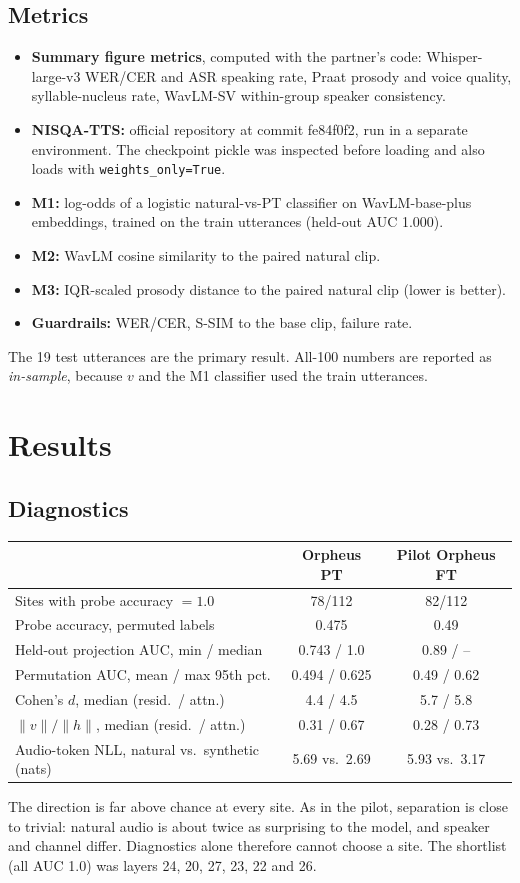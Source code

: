 \documentclass[11pt]{article}
\begin{document}
\subsection{Metrics}
\begin{itemize}
\item \textbf{Summary figure metrics}, computed with the partner's code: Whisper-large-v3 WER/CER and ASR speaking rate, Praat prosody and voice quality, syllable-nucleus rate, WavLM-SV within-group speaker consistency.
\item \textbf{NISQA-TTS:} official repository at commit fe84f0f2, run in a separate environment. The checkpoint pickle was inspected before loading and also loads with \texttt{weights\_only=True}.
\item \textbf{M1:} log-odds of a logistic natural-vs-PT classifier on WavLM-base-plus embeddings, trained on the train utterances (held-out AUC 1.000).
\item \textbf{M2:} WavLM cosine similarity to the paired natural clip.
\item \textbf{M3:} IQR-scaled prosody distance to the paired natural clip (lower is better).
\item \textbf{Guardrails:} WER/CER, S-SIM to the base clip, failure rate.
\end{itemize}
The 19 test utterances are the primary result. All-100 numbers are reported as \emph{in-sample}, because $v$ and the M1 classifier used the train utterances.

\section{Results}
\subsection{Diagnostics}
\begin{center}
\begin{tabular}{lcc}
\toprule
 & Orpheus PT & Pilot Orpheus FT \\
\midrule
Sites with probe accuracy $=1.0$ & 78/112 & 82/112 \\
Probe accuracy, permuted labels & 0.475 & 0.49 \\
Held-out projection AUC, min / median & 0.743 / 1.0 & 0.89 / -- \\
Permutation AUC, mean / max 95th pct. & 0.494 / 0.625 & 0.49 / 0.62 \\
Cohen's $d$, median (resid.\ / attn.) & 4.4 / 4.5 & 5.7 / 5.8 \\
$\|v\|/\|h\|$, median (resid.\ / attn.) & 0.31 / 0.67 & 0.28 / 0.73 \\
Audio-token NLL, natural vs.\ synthetic (nats) & 5.69 vs.\ 2.69 & 5.93 vs.\ 3.17 \\
\bottomrule
\end{tabular}
\end{center}
The direction is far above chance at every site. As in the pilot, separation is close to trivial: natural audio is about twice as surprising to the model, and speaker and channel differ. Diagnostics alone therefore cannot choose a site. The shortlist (all AUC 1.0) was layers 24, 20, 27, 23, 22 and 26.
\end{document}
